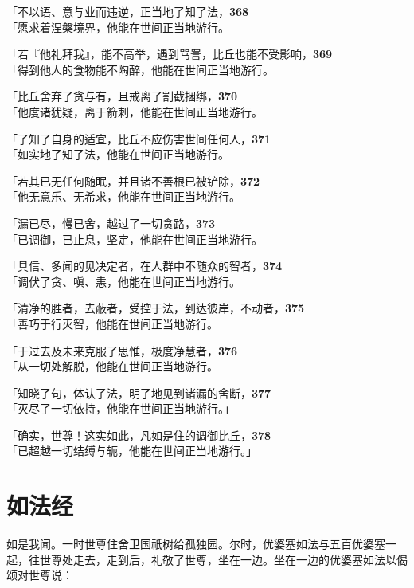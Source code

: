 「不以语、意与业而违逆，正当地了知了法，\hfill{\grayfootnotesize \textbf{368}} \\
「愿求着涅槃境界，他能在世间正当地游行。


「若『他礼拜我』，能不高举，遇到骂詈，比丘也能不受影响，\hfill{\grayfootnotesize \textbf{369}} \\
「得到他人的食物能不陶醉，他能在世间正当地游行。


「比丘舍弃了贪与有，且戒离了割截捆绑，\hfill{\grayfootnotesize \textbf{370}} \\
「他度诸犹疑，离于箭刺，他能在世间正当地游行。


「了知了自身的适宜，比丘不应伤害世间任何人，\hfill{\grayfootnotesize \textbf{371}} \\
「如实地了知了法，他能在世间正当地游行。


「若其已无任何随眠，并且诸不善根已被铲除，\hfill{\grayfootnotesize \textbf{372}} \\
「他无意乐、无希求，他能在世间正当地游行。


「漏已尽，慢已舍，越过了一切贪路，\hfill{\grayfootnotesize \textbf{373}} \\
「已调御，已止息，坚定，他能在世间正当地游行。


「具信、多闻的见决定者，在人群中不随众的智者，\hfill{\grayfootnotesize \textbf{374}} \\
「调伏了贪、嗔、恚，他能在世间正当地游行。


「清净的胜者，去蔽者，受控于法，到达彼岸，不动者，\hfill{\grayfootnotesize \textbf{375}} \\
「善巧于行灭智，他能在世间正当地游行。


「于过去及未来克服了思惟，极度净慧者，\hfill{\grayfootnotesize \textbf{376}} \\
「从一切处解脱，他能在世间正当地游行。


「知晓了句，体认了法，明了地见到诸漏的舍断，\hfill{\grayfootnotesize \textbf{377}} \\
「灭尽了一切依持，他能在世间正当地游行。」


「确实，世尊！这实如此，凡如是住的调御比丘，\hfill{\grayfootnotesize \textbf{378}} \\
「已超越一切结缚与轭，他能在世间正当地游行。」


\section{如法经}

如是我闻。一时世尊住舍卫国祇树给孤独园。尔时，优婆塞如法与五百优婆塞一起，往世尊处走去，走到后，礼敬了世尊，坐在一边。坐在一边的优婆塞如法以偈颂对世尊说：


